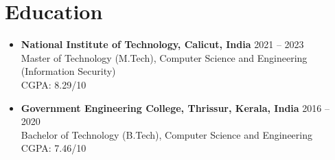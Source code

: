 \section*{Education}
\begin{itemize}[leftmargin=0.5cm]
    \item \textbf{National Institute of Technology, Calicut, India} \hfill 2021 -- 2023 \\
          Master of Technology (M.Tech), Computer Science and Engineering (Information Security) \\
          CGPA: 8.29/10
    \item \textbf{Government Engineering College, Thrissur, Kerala, India} \hfill 2016 -- 2020 \\
          Bachelor of Technology (B.Tech), Computer Science and Engineering \\
          CGPA: 7.46/10
\end{itemize}
